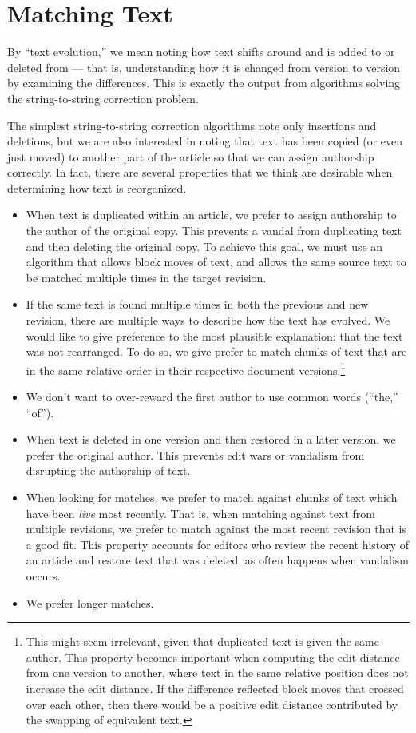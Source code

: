 \section{Matching Text}

By ``text evolution,'' we mean noting how text shifts
around and is added to or deleted from --- that is,
understanding how it is changed from version to version
by examining the differences.
This is exactly the output from algorithms solving the
string-to-string correction problem.

The simplest string-to-string correction algorithms
note only insertions and deletions, but we are also interested
in noting that text has been copied (or even just moved)
to another part of the article so that we can assign authorship
correctly.
In fact, there are several properties that we think are desirable
when determining how text is reorganized.
\begin{itemize}
\item When text is duplicated within an article, we prefer to assign
    authorship to the author of the original copy.
    This prevents a vandal from duplicating text and then deleting the
    original copy.
    To achieve this goal, we must use an algorithm that allows
    block moves of text, and allows the same source text to be
    matched multiple times in the target revision.
\item If the same text is found multiple times in both the previous
    and new revision, there are multiple ways to describe how the
    text has evolved.
    We would like to give preference to the most plausible explanation:
    that the text was not rearranged.
    To do so, we give prefer to match chunks of text that are in the
    same relative order in their respective document
    versions.\footnote{This might seem irrelevant, given that duplicated
    text is given the same author.  This property becomes important
    when computing the edit distance from one version to another,
    where text in the same relative position does not increase the
    edit distance.  If the difference reflected block moves that
    crossed over each other, then there would be a positive edit
    distance contributed by the swapping of equivalent text.}
\item We don't want to over-reward the first author to use common
    words (\eg ``the,'' ``of'').
\item When text is deleted in one version and then restored in a later
    version, we prefer the original author.
    This prevents edit wars or vandalism from disrupting the
    authorship of text.
\item When looking for matches, we prefer to match against chunks
    of text which have been \textit{live} most recently.
    That is, when matching against text from multiple revisions,
    we prefer to match against the most recent revision that is
    a good fit.
    This property accounts for editors who review the recent history
    of an article and restore text that was deleted, as often happens
    when vandalism occurs.
\item We prefer longer matches.
\end{itemize}



